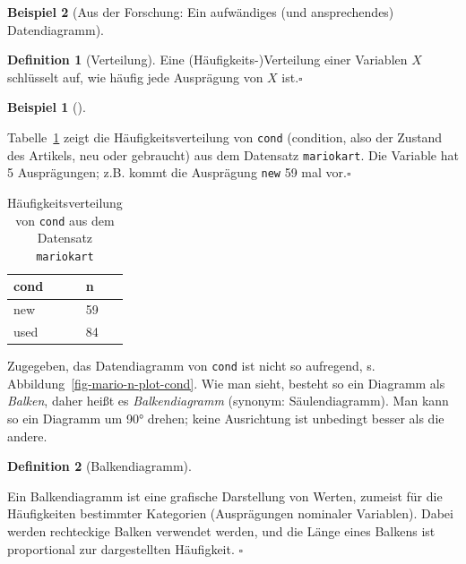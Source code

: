 \documentclass[
  a4paper,
]{scrbook}
\theoremstyle{definition}
\newtheorem{example}{Beispiel}[chapter]
\theoremstyle{definition}
\newtheorem{definition}{Definition}[chapter]
\theoremstyle{definition}
\theoremstyle{remark}
\begin{document}
\begin{example}[Aus der Forschung: Ein aufwändiges (und ansprechendes)
Datendiagramm]
\begin{definition}[Verteilung]
Eine (Häufigkeits-)Verteilung einer Variablen \(X\) schlüsselt auf, wie
häufig jede Ausprägung von \(X\) ist.\(\square\)

\end{definition}

\begin{example}[]\protect\hypertarget{exm-verteilung1}{}\label{exm-verteilung1}

Tabelle~\ref{tbl-wheels-n} zeigt die Häufigkeitsverteilung von
\texttt{cond} (condition, also der Zustand des Artikels, neu oder
gebraucht) aus dem Datensatz \texttt{mariokart}. Die Variable hat 5
Ausprägungen; z.B. kommt die Ausprägung \texttt{new} 59 mal
vor.\(\square\)

\end{example}

\begin{longtable}[]{@{}ll@{}}

\caption{\label{tbl-wheels-n}Häufigkeitsverteilung von \texttt{cond} aus
dem Datensatz \texttt{mariokart}}

\tabularnewline

\toprule\noalign{}
cond & n \\
\midrule\noalign{}
\endhead
\bottomrule\noalign{}
\endlastfoot
new & 59 \\
used & 84 \\

\end{longtable}

Zugegeben, das Datendiagramm von \texttt{cond} ist nicht so aufregend,
s. Abbildung~\ref{fig-mario-n-plot-cond}. Wie man sieht, besteht so ein
Diagramm als \emph{Balken}, daher heißt es \emph{Balkendiagramm}
(synonym: Säulendiagramm). Man kann so ein Diagramm um 90° drehen; keine
Ausrichtung ist unbedingt besser als die andere.

\begin{definition}[Balkendiagramm]\protect\hypertarget{def-balken}{}\label{def-balken}

Ein Balkendiagramm ist eine grafische Darstellung von Werten, zumeist
für die Häufigkeiten bestimmter Kategorien (Ausprägungen nominaler
Variablen). Dabei werden rechteckige Balken verwendet werden, und die
Länge eines Balkens ist proportional zur dargestellten Häufigkeit.
\(\square\)

\end{definition}

\begin{figure}

\begin{minipage}{0.50\linewidth}


\end{minipage}
\end{figure}
\end{example}
\end{document}
